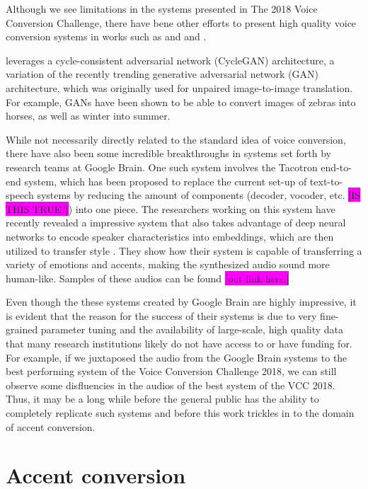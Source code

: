 \documentclass
[
    a4paper,
    twoside,
    12pt,
]
{report}
\begin{document}
Although we see limitations in the systems presented in The 2018 Voice
Conversion Challenge, there have bene other efforts to present high
quality voice conversion systems in works such as and
\textcite{nguyen2016} and \textcite{fang2018}.

\textcite{fang2018} leverages a cycle-consistent adversarial network
(CycleGAN) architecture, a variation of the recently trending generative
adversarial network (GAN) architecture, which was originally used for
unpaired image-to-image translation. For example, GANs have been shown
to be able to convert images of zebras into horses, as well as winter
into summer.

While not necessarily directly related to the standard idea of voice
conversion, there have also been some incredible breakthroughs in
systems set forth by research teams at Google Brain. One such system
involves the Tacotron end-to-end system, which has been proposed to
replace the current set-up of text-to-speech systems by reducing the
amount of components (decoder, vocoder, etc.
\colorbox{magenta}{[IS THIS TRUE?]}) into one piece. The researchers
working on this system have recently revealed a impressive system that
also takes advantage of deep neural networks to encode speaker
characteristics into embeddings, which are then utilized to transfer
style \parencite{wang2018}. They show how their system is capable of
transferring a variety of emotions and accents, making the synthesized
audio sound more human-like. Samples of these audios can be found
\colorbox{magenta}{[put link here.]}

Even though the these systems created by Google Brain are highly
impressive, it is evident that the reason for the success of their
systems is due to very fine-grained parameter tuning and the
availability of large-scale, high quality data that many research
institutions likely do not have access to or have funding for. For
example, if we juxtaposed the audio from the Google Brain systems to the
best performing system of the Voice Conversion Challenge 2018, we can
still observe some disfluencies in the audios of the best system of the
VCC 2018. Thus, it may be a long while before the general public has the
ability to completely replicate such systems and before this work
trickles in to the domain of accent conversion.

\hypertarget{accent-conversion}{%
\section{Accent conversion}\label{accent-conversion}}
\end{document}
